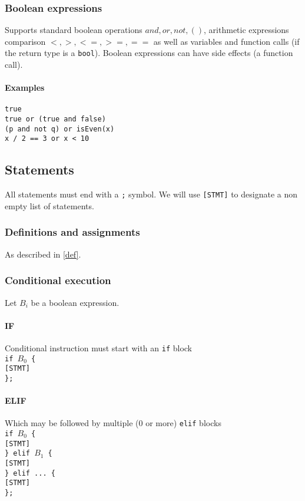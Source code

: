 \documentclass{article}
\begin{document}
\subsubsection{Boolean expressions}
Supports standard boolean operations $and, or, not, ()$, arithmetic expressions
comparison $<, >, <=, >=, ==$ as well as variables and function calls (if the
return type is a \texttt{bool}). Boolean expressions can have side effects
(a function call).

\paragraph{Examples}
\texttt{true} \\
\texttt{true or (true and false)} \\
\texttt{(p and not q) or isEven(x)} \\
\texttt{x / 2 == 3 or x < 10}

\subsection{Statements}
All statements must end with a \texttt{;} symbol. We will use \texttt{[STMT]} to
designate a non empty list of statements.

\subsubsection{Definitions and assignments}
As described in \ref{def}.

\subsubsection{Conditional execution}
Let $B_i$ be a boolean expression.

\paragraph{IF}
Conditional instruction must start with an \texttt{if} block \\
\texttt{if $B_0$ \{ \\
  \hspace*{2em} [STMT] \\
\};}

\paragraph{ELIF}
Which may be followed by multiple (0 or more) \texttt{elif} blocks \\
\texttt{if $B_0$ \{ \\
  \hspace*{2em} [STMT] \\
\} elif $B_1$ \{ \\
  \hspace*{2em} [STMT] \\
\} elif ... \{ \\
  \hspace*{2em} [STMT] \\
\};}
\end{document}
